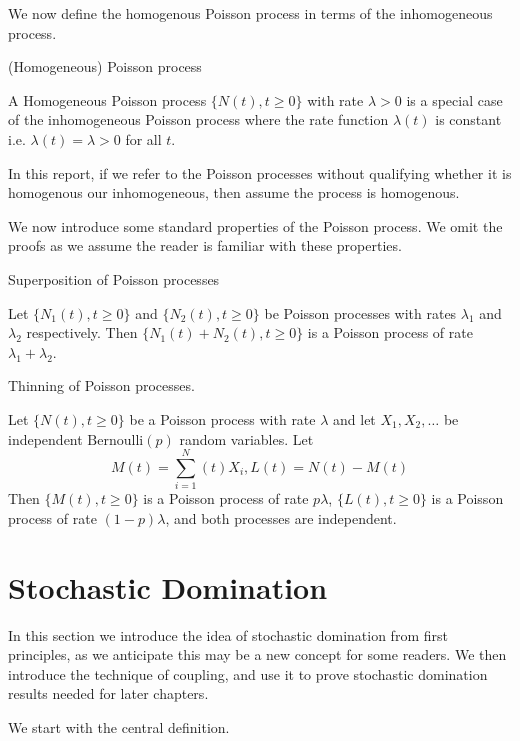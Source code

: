 We now define the homogenous Poisson process in terms of the inhomogeneous process.

\begin{definition}
	(Homogeneous) Poisson process

	\noindent
	A Homogeneous Poisson process $\{N(t), t \geq 0\}$ with rate $\lambda > 0$ is a special case of the inhomogeneous Poisson process where the rate function $\lambda(t)$ is constant i.e. $\lambda(t)=\lambda > 0$ for all $t$.
\end{definition}

In this report, if we refer to the Poisson processes without qualifying whether it is homogenous our inhomogeneous, then assume the process is homogenous.

We now introduce some standard properties of the Poisson process. We omit the proofs as we assume the reader is familiar with these properties.

\begin{theorem}
	Superposition of Poisson processes

	\noindent
	Let $\{N_1(t), t \geq 0\}$ and $\{N_2(t), t \geq 0\}$ be Poisson processes with rates $\lambda_1$ and $\lambda_2$ respectively. Then $\{N_1(t) + N_2(t), t \geq 0\}$ is a Poisson process of rate $\lambda_1 + \lambda_2$.
\end{theorem}

\begin{theorem}
	Thinning of Poisson processes.

	\noindent
	Let $\{N(t), t \geq 0\}$ be a Poisson process with rate $\lambda$ and let $X_1, X_2, \dots$ be independent $\text{Bernoulli}(p)$ random variables. Let
	$$
		M(t) = \sum_{i=1}^N(t) X_i, L(t) = N(t) - M(t)
	$$
	Then $\{M(t), t \geq 0\}$ is a Poisson process of rate $p\lambda$, $\{L(t), t \geq 0\}$ is a Poisson process of rate $(1-p)\lambda$, and both processes are independent.
\end{theorem}

\section{Stochastic Domination}

In this section we introduce the idea of stochastic domination from first principles, as we anticipate this may be a new concept for some readers. We then introduce the technique of coupling, and use it to prove stochastic domination results needed for later chapters.

We start with the central definition.


